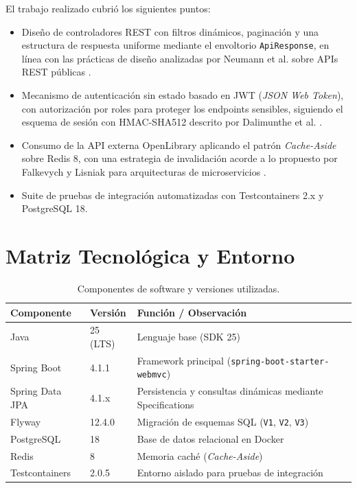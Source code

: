\documentclass[11pt,a4paper]{article}
\begin{document}
El trabajo realizado cubrió los siguientes puntos:
\begin{itemize}[noitemsep]
    \item Diseño de controladores REST con filtros dinámicos, paginación y una estructura de respuesta uniforme mediante el envoltorio \texttt{ApiResponse}, en línea con las prácticas de diseño analizadas por Neumann et al. sobre APIs REST públicas \cite{neumann2021analysis}.
    \item Mecanismo de autenticación sin estado basado en JWT (\textit{JSON Web Token}), con autorización por roles para proteger los endpoints sensibles, siguiendo el esquema de sesión con HMAC-SHA512 descrito por Dalimunthe et al. \cite{dalimunthe2023jwt}.
    \item Consumo de la API externa OpenLibrary aplicando el patrón \textit{Cache-Aside} sobre Redis 8, con una estrategia de invalidación acorde a lo propuesto por Falkevych y Lisniak para arquitecturas de microservicios \cite{falkevych2023invalidation}.
    \item Suite de pruebas de integración automatizadas con Testcontainers 2.x y PostgreSQL 18.
\end{itemize}

\section{Matriz Tecnológica y Entorno}

\begin{table}[H]
\centering
\caption{Componentes de software y versiones utilizadas.}
\begin{tabular}{lll}
\toprule
\textbf{Componente} & \textbf{Versión} & \textbf{Función / Observación} \\
\midrule
Java & 25 (LTS) & Lenguaje base (SDK 25) \\
Spring Boot & 4.1.1 & Framework principal (\texttt{spring-boot-starter-webmvc}) \\
Spring Data JPA & 4.1.x & Persistencia y consultas dinámicas mediante Specifications \\
Flyway & 12.4.0 & Migración de esquemas SQL (\texttt{V1}, \texttt{V2}, \texttt{V3}) \\
PostgreSQL & 18 & Base de datos relacional en Docker \\
Redis & 8 & Memoria caché (\textit{Cache-Aside}) \\
Testcontainers & 2.0.5 & Entorno aislado para pruebas de integración \\
\bottomrule
\end{tabular}
\end{table}
\end{document}
